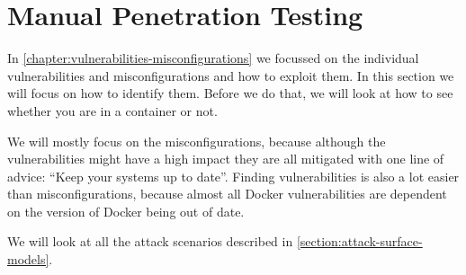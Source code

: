 \section{Manual Penetration Testing}

In \autoref{chapter:vulnerabilities-misconfigurations} we focussed on the individual vulnerabilities and misconfigurations and how to exploit them. In this section we will focus on how to identify them. Before we do that, we will look at how to see whether you are in a container or not.

We will mostly focus on the misconfigurations, because although the vulnerabilities might have a high impact they are all mitigated with one line of advice: ``Keep your systems up to date''. Finding vulnerabilities is also a lot easier than misconfigurations, because almost all Docker vulnerabilities are dependent on the version of Docker being out of date.

We will look at all the attack scenarios described in \autoref{section:attack-surface-models}.





